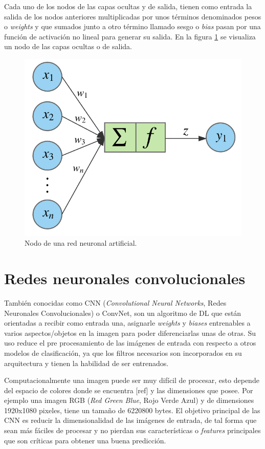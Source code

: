 Cada uno de los nodos de las capas ocultas y de salida, tienen como entrada la salida de los nodos anteriores multiplicadas por unos términos denominados pesos o \textit{weights} y que sumados junto a otro término llamado sesgo o \textit{bias} pasan por una función de activación no lineal para generar su salida. En la figura \ref{fig:neural_network_node} se visualiza un nodo de las capas ocultas o de salida.
\begin{figure}[h]
	\centering
	\includegraphics[scale=0.25]{./Figures/neural_network_node.png}
	\caption{Nodo de una red neuronal artificial.}
	\label{fig:neural_network_node}
\end{figure}

\section{Redes neuronales convolucionales}
También conocidas como CNN (\textit{Convolutional Neural Networks}, Redes Neuronales Convolucionales) o ConvNet, son un algoritmo de DL que están orientadas a recibir como entrada una, asignarle \textit{weights} y \textit{biases} entrenables a varios aspectos/objetos en la imagen para poder diferenciarlas unas de otras. Su uso reduce el pre procesamiento de las imágenes de entrada con respecto a otros modelos de clasificación, ya que los filtros necesarios son incorporados en su arquitectura y tienen la habilidad de ser entrenados.

Computacionalmente una imagen puede ser muy difícil de procesar, esto depende del espacio de colores donde se encuentra [ref] y las dimensiones que posee. Por ejemplo una imagen RGB (\textit{Red Green Blue}, Rojo Verde Azul) y de dimensiones 1920x1080 pixeles, tiene un tamaño de 6220800 bytes. El objetivo principal de las CNN es reducir la dimensionalidad de las imágenes de entrada, de tal forma que sean más fáciles de procesar y no pierdan sus características o \textit{features} principales que son críticas para obtener una buena predicción.

